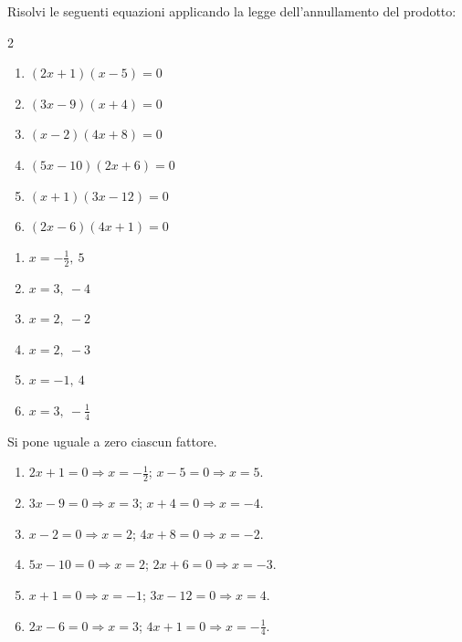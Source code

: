 
\begin{question}[ID=5.2, subtitle={Legge dell'annullamento del prodotto}, difficulty=facile, tags={annullamento del prodotto}]
Risolvi le seguenti equazioni applicando la legge dell'annullamento del prodotto:
\begin{multicols}{2}
\begin{enumerate}[leftmargin=3cm]
    \item $(2x+1)(x-5)=0$
    \item $(3x-9)(x+4)=0$
    \item $(x-2)(4x+8)=0$
    \item $(5x-10)(2x+6)=0$
    \item $(x+1)(3x-12)=0$
    \item $(2x-6)(4x+1)=0$
\end{enumerate}
\end{multicols}
\begin{solution}
\begin{enumerate}
    \item $x=-\tfrac12,\ 5$
    \item $x=3,\ -4$
    \item $x=2,\ -2$
    \item $x=2,\ -3$
    \item $x=-1,\ 4$
    \item $x=3,\ -\tfrac14$
\end{enumerate}
\end{solution}
\begin{explanation}
Si pone uguale a zero ciascun fattore.
\begin{enumerate}
    \item $2x+1=0 \Rightarrow x=-\tfrac12$; \quad $x-5=0 \Rightarrow x=5$.
    \item $3x-9=0 \Rightarrow x=3$; \quad $x+4=0 \Rightarrow x=-4$.
    \item $x-2=0 \Rightarrow x=2$; \quad $4x+8=0 \Rightarrow x=-2$.
    \item $5x-10=0 \Rightarrow x=2$; \quad $2x+6=0 \Rightarrow x=-3$.
    \item $x+1=0 \Rightarrow x=-1$; \quad $3x-12=0 \Rightarrow x=4$.
    \item $2x-6=0 \Rightarrow x=3$; \quad $4x+1=0 \Rightarrow x=-\tfrac14$.
\end{enumerate}
\end{explanation}
\end{question}

